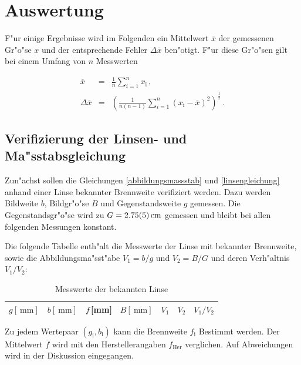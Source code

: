 \section{Auswertung}
	\label{sec:auswertung}

	F"ur einige Ergebnisse wird im Folgenden ein Mittelwert $\overline{x}$ der gemessenen Gr"o"se $x$ und der entsprechende Fehler $\Delta \overline{x}$ ben"otigt.
	F"ur diese Gr"o"sen gilt bei einem Umfang von $n$ Messwerten

	\begin{eqnarray*}
		\overline{x} & = & \frac{1}{n} \sum_{i=1}^{n}{x_\mathrm{i}} \, , \\
		\Delta \overline{x} & = & \left(\frac{1}{n (n-1)} \sum_{i = 1}^{n}{{\left(x_\mathrm{i} - \overline{x}\right)}^2}\right)^\frac{1}{2} \, .
	\end{eqnarray*}

	\subsection{Verifizierung der Linsen- und Ma"sstabsgleichung}
		\label{subsec:verifizierung}
		Zun"achst sollen die Gleichungen \eqref{abbildungsmassstab} und \eqref{linsengleichung} anhand einer Linse bekannter Brennweite verifiziert werden.
		Dazu werden Bildweite $b$, Bildgr"o"se $B$ und Gegenstandsweite $g$ gemessen.
		Die Gegenstandsgr"o"se wird zu $G = \SI{2.75 (5)}{\centi \meter}$ gemessen und bleibt bei allen folgenden Messungen konstant.

		Die folgende Tabelle enth"alt die Messwerte der Linse mit bekannter Brennweite, sowie die Abbildungsma"sst"abe $V_1 = b/g$ und $V_2 = B/G$ und deren Verh"altnis $V_1/V_2$:

		\begin{table}[!h]
			\begin{center}
				\label{tabelle:bekannt}
				\caption{Messwerte der bekannten Linse}
				\begin{tabular}{|c|c|c|c|c|c|c|}
					\hline 
					$g [\SI{}{\milli \meter}]$ & $b [\SI{}{\milli \meter}]$ & $f$\,[mm] & $B [\SI{}{\milli \meter}]$ & $V_1$ & $V_2$ & $V_1/V_2$ \\
					\hline 
					\hline
					
					\hline 
				\end{tabular}
			\end{center}
		\end{table}

		Zu jedem Wertepaar $(g_\mathrm{i}, b_\mathrm{i})$ kann die Brennweite $f_\mathrm{i}$ Bestimmt werden.
		Der Mittelwert $\overline{f}$ wird mit den Herstellerangaben $f_\mathrm{Her}$ verglichen.
		Auf Abweichungen wird in der Diskussion eingegangen.

